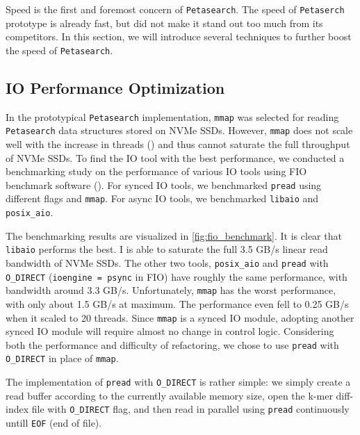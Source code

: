 Speed is the first and foremost concern of \texttt{Petasearch}. The speed of \texttt{Petaserch} prototype is already fast, but did not make it stand out too much from its competitors. In this section, we will introduce several techniques to further boost the speed of \texttt{Petasearch}.

\subsection{IO Performance Optimization}

In the prototypical \texttt{Petasearch} implementation, \texttt{mmap} was selected for reading \texttt{Petasearch} data structures stored on NVMe SSDs. However, \texttt{mmap} does not scale well with the increase in threads (\cite{papagiannis2020optimizing}) and thus cannot saturate the full throughput of NVMe SSDs. To find the IO tool with the best performance, we conducted a benchmarking study on the performance of various IO tools using FIO benchmark software (\cite{AxboeFlexibleIOTester2022}). For synced IO tools, we benchmarked \texttt{pread} using different flags and \texttt{mmap}. For async IO tools, we benchmarked \texttt{libaio} and \texttt{posix\_aio}.

The benchmarking results are visualized in \autoref{fig:fio_benchmark}. It is clear that \texttt{libaio} performs the best. I is able to saturate the full 3.5 GB/s linear read bandwidth of NVMe SSDs. The other two tools, \texttt{posix\_aio} and \texttt{pread} with \texttt{O\_DIRECT} (\texttt{ioengine = psync} in FIO) have roughly the same performance, with bandwidth around 3.3 GB/s. Unfortunately, \texttt{mmap} has the worst performance, with only about 1.5 GB/s at maximum. The performance even fell to 0.25 GB/s when it scaled to 20 threads. Since \texttt{mmap} is a synced IO module, adopting another synced IO module will require almost no change in control logic. Considering both the performance and difficulty of refactoring, we chose to use \texttt{pread} with \texttt{O\_DIRECT} in place of \texttt{mmap}.

The implementation of \texttt{pread} with \texttt{O\_DIRECT} is rather simple: we simply create a read buffer according to the currently available memory size, open the k-mer diff-index file with \texttt{O\_DIRECT} flag, and then read in parallel using \texttt{pread} continuously untill \texttt{EOF} (end of file).

